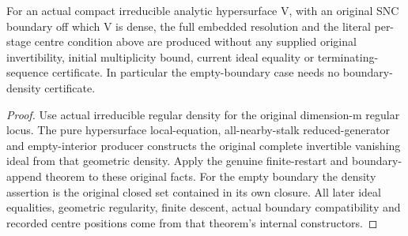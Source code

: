 \begin{corollary}
\label{hir:natural-hypersurface-embedded-stage-centres}
\leanok
{}
For an actual compact irreducible analytic hypersurface V, with an
original SNC boundary off which V is dense, the full embedded resolution
and the literal per-stage centre condition above are produced without
any supplied original invertibility, initial multiplicity bound, current
ideal equality or terminating-sequence certificate. In particular the
empty-boundary case needs no boundary-density certificate.
\end{corollary}
\begin{proof}
Use actual irreducible regular density for the original dimension-m
regular locus. The pure hypersurface local-equation, all-nearby-stalk
reduced-generator and empty-interior producer constructs the original
complete invertible vanishing ideal from that geometric density. Apply the genuine finite-restart
and boundary-append theorem to these original facts. For the empty
boundary the density assertion is the original closed set contained in
its own closure. All later ideal equalities, geometric regularity,
finite descent, actual boundary compatibility and recorded centre positions
come from that theorem's internal constructors.
\end{proof}


